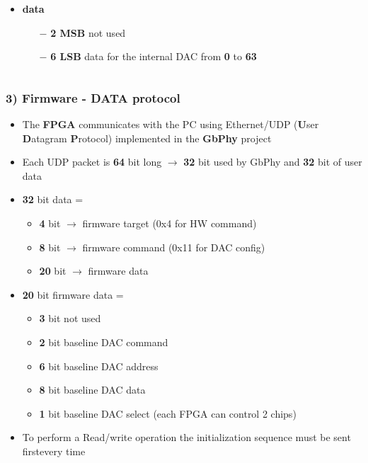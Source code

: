 \documentclass[aspectratio=169]{beamer}
\begin{document}
\begin{frame}
\begin{columns}
\begin{itemize}
\begin{itemize}
\begin{itemize}
					\end{itemize}
					\item \textbf{data}
					\begin{itemize}
						\item[$-$] \textbf{2 MSB} not used
						\item[$-$] \textbf{6 LSB} data for the internal DAC \newline from \textbf{0} to \textbf{63}
					\end{itemize}
				\end{itemize} 
			\end{itemize}
		\end{columns}
	\end{frame}

	\begin{frame}
	\frametitle{3) Firmware - DATA protocol}
	\begin{itemize}
		\item The \textbf{FPGA} communicates with the PC using Ethernet/UDP (\textbf{U}ser \textbf{D}atagram \textbf{P}rotocol) implemented in the \textbf{GbPhy} project
		\item Each UDP packet is \textbf{64} bit long $\rightarrow$ \textbf{32} bit used by GbPhy and \textbf{32} bit of user data
		\item \textbf{32} bit data =
		\begin{itemize}
			\item \textbf{4} bit $\rightarrow$ firmware target (0x4 for HW command)
			\item \textbf{8} bit $\rightarrow$ firmware command (0x11 for DAC config)
			\item \textbf{20} bit $\rightarrow$ firmware data
		\end{itemize}
		\item \textbf{20} bit firmware data =
		\begin{itemize}
			\item \textbf{3} bit not used
			\item \textbf{2} bit baseline DAC command
			\item \textbf{6} bit baseline DAC address
			\item \textbf{8} bit baseline DAC data
			\item \textbf{1} bit baseline DAC select (each FPGA can control 2 chips)
		\end{itemize}
		\item To perform a Read/write operation the initialization sequence must be sent first\newline every time
	\end{itemize}
	\end{frame}
\end{document}
